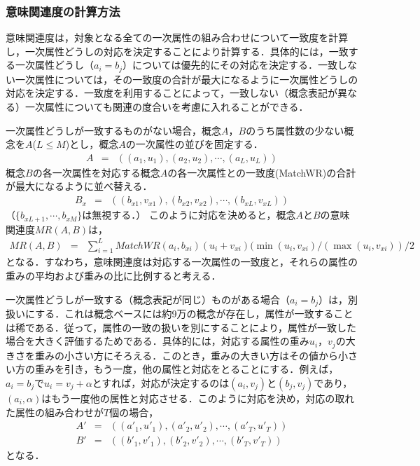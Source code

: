 \subsubsection{意味関連度の計算方法}

意味関連度は，対象となる全ての一次属性の組み合わせについて一致度を計算し，一次属性どうしの対応を決定することにより計算する．具体的には，一致する一次属性どうし（$a_i=b_j$）については優先的にその対応を決定する．一致しない一次属性については，その一致度の合計が最大になるように一次属性どうしの対応を決定する．一致度を利用することによって，一致しない（概念表記が異なる）一次属性についても関連の度合いを考慮に入れることができる．

一次属性どうしが一致するものがない場合，概念$A$，$B$のうち属性数の少ない概念を$A$($L \le M$)とし，概念$A$の一次属性の並びを固定する．
\begin{eqnarray}
A &=& ( (a_1, u_1), (a_2, u_2), \cdots, (a_L, u_L) )
\end{eqnarray}
概念$B$の各一次属性を対応する概念$A$の各一次属性との一致度(MatchWR)の合計が最大になるように並べ替える． 
\begin{eqnarray}
B_x &=& ( (b_{x1}, v_{x1}), (b_{x2}, v_{x2}), \cdots, (b_{xL}, v_{xL}) )
\end{eqnarray}
（$\{ b_{xL+1}, \cdots, b_{xM} \}$は無視する．）
このように対応を決めると，概念$A$と$B$の意味関連度$MR(A,B)$は，
\begin{eqnarray}
MR(A,B) &=& \sum_{i=1}^{L} MatchWR(a_i,b_{xi})(u_i+v_{xi})(\min(u_i,v_{xi})/(\max(u_i,v_{xi}))/2
\end{eqnarray}
となる．すなわち，意味関連度は対応する一次属性の一致度と，それらの属性の重みの平均および重みの比に比例すると考える．

一次属性どうしが一致する（概念表記が同じ）ものがある場合（$a_i=b_j$）は，別扱いにする．これは概念ベースには約9万の概念が存在し，属性が一致することは稀である．従って，属性の一致の扱いを別にすることにより，属性が一致した場合を大きく評価するためである．具体的には，対応する属性の重み$u_i$，$v_j$の大きさを重みの小さい方にそろえる．このとき，重みの大きい方はその値から小さい方の重みを引き，もう一度，他の属性と対応をとることにする．例えば，$a_i=b_j$で$u_i=v_j+\alpha$とすれば，対応が決定するのは$(a_i,v_j)$と$(b_j,v_j)$であり，$(a_i,\alpha)$はもう一度他の属性と対応させる．このように対応を決め，対応の取れた属性の組み合わせが$T$個の場合，
\begin{eqnarray}
A' &=& ( (a'_1, u'_1), (a'_2, u'_2), \cdots, (a'_T, u'_T) ) \\
B' &=& ( (b'_1, v'_1), (b'_2, v'_2), \cdots, (b'_T, v'_T) )
\end{eqnarray}
となる．

